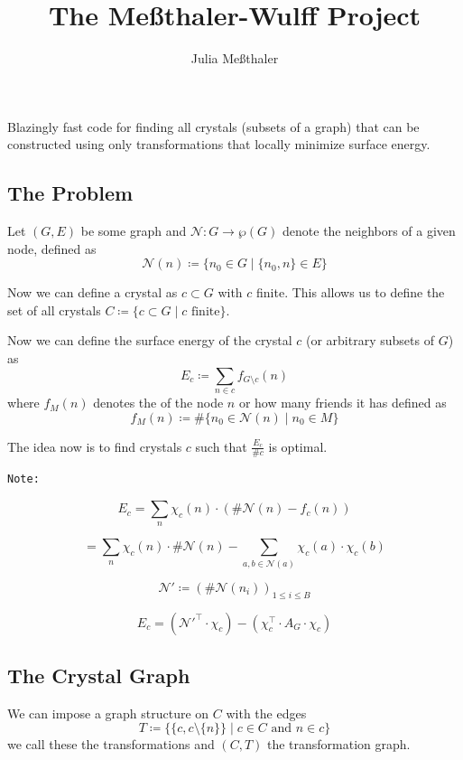 \documentclass[
]{article}
\title{The Meßthaler-Wulff Project}
\author{Julia Meßthaler}
\date{}
\begin{document}
\maketitle

Blazingly fast code for finding all crystals (subsets of a graph) that
can be constructed using only transformations that locally minimize
surface energy.

\hypertarget{the-problem}{%
\subsection{The Problem}\label{the-problem}}

Let \((G, E)\) be some graph and \(\mathcal{N}: G \rightarrow \wp(G)\)
denote the neighbors of a given node, defined as \[
  \mathcal{N}(n) \coloneq \{ n_0 \in G \mid \{n_0, n\} \in E \}
\]

Now we can define a crystal as \(c \subset G\) with \(c\) finite. This
allows us to define the set of all crystals
\(C \coloneq \{ c \subset G \mid c \text{ finite} \}\).

Now we can define the surface energy of the crystal \(c\) (or arbitrary
subsets of \(G\)) as \[
  E_c \coloneq \sum_{n \in c} f_{G \setminus c}(n)
\] where \(f_M(n)\) denotes the  of the node
\(n\) or how many friends it has defined as \[
  f_M(n) \coloneq \# \{ n_0 \in \mathcal{N}(n) \mid n_0 \in M \}
\]

The idea now is to find crystals \(c\) such that \(\frac{E_{c}}{\#c}\)
is optimal.

\begin{verbatim}
Note:
\end{verbatim}

\[
    E_c = \sum_{n} \chi_c(n) \cdot (\#\mathcal{N}(n) - f_c(n))
\]

\[
    = \sum_n \chi_c(n) \cdot \#\mathcal{N}(n) - \sum_{a,b \in \mathcal{N}(a)} \chi_c(a) \cdot \chi_c(b)
\]

\[
    \mathcal{N}' \coloneq (\#\mathcal{N}(n_i))_{1 \le i \le B}
\]

\[
    E_c = (\mathcal{N}'^\top \cdot \chi_c) - (\chi_c^\top \cdot A_G \cdot \chi_c)
\]

\hypertarget{the-crystal-graph}{%
\subsection{The Crystal Graph}\label{the-crystal-graph}}

We can impose a graph structure on \(C\) with the edges \[
  T \coloneq \{ \{ c, c \setminus \{n\} \} \mid c \in C \text{ and } n \in c \}
\] we call these the transformations and \((C,T)\) the transformation
graph.
\end{document}
